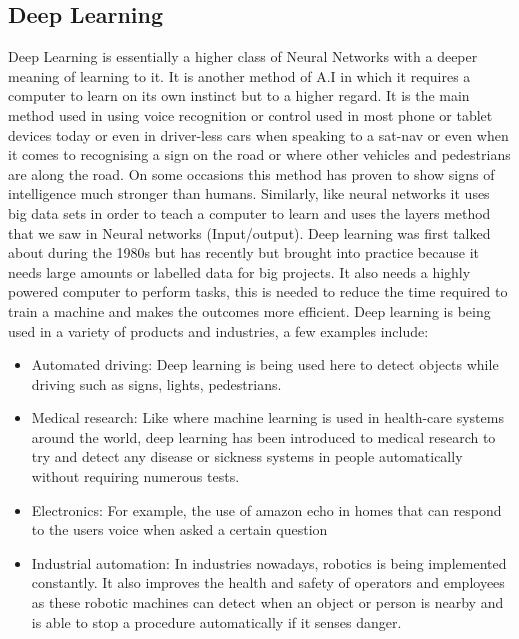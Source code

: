 \documentclass[letterpaper, 10 pt, conference]{ieeeconf}  %
\begin{document}
\subsection{Deep Learning}
Deep Learning is essentially a higher class of Neural Networks with a deeper meaning of learning to it. It is another method of A.I in which it requires a computer to learn on its own instinct but to a higher regard. It is the main method used in using voice recognition or control used in most phone or tablet devices today or even in driver-less cars when speaking to a sat-nav or even when it comes to recognising a sign on the road or where other vehicles and pedestrians are along the road. On some occasions this method has proven to show signs of intelligence much stronger than humans. Similarly, like neural networks it uses big data sets in order to teach a computer to learn and uses the layers method that we saw in Neural networks (Input/output). Deep learning was first talked about during the 1980s but has recently but brought into practice because it needs large amounts or labelled data for big projects. It also needs a highly powered computer to perform tasks, this is needed to reduce the time required to train a machine and makes the outcomes more efficient. Deep learning is being used in a variety of products and industries, a few examples include:
\begin{itemize}
\item Automated driving: Deep learning is being used here to detect objects while driving such as signs, lights, pedestrians.
\end{itemize}

\begin{itemize}
\item Medical research: Like where machine learning is used in health-care systems around the world, deep learning has been introduced to medical research to try and detect any disease or sickness systems in people automatically without requiring numerous tests.
\end{itemize}

\begin{itemize}
\item Electronics: For example, the use of amazon echo in homes that can respond to the users voice when asked a certain question
\end{itemize}

\begin{itemize}
\item Industrial automation: In industries nowadays, robotics is being implemented constantly. It also improves the health and safety of operators and employees as these robotic machines can detect when an object or person is nearby and is able to stop a procedure automatically if it senses danger.
\end{itemize}
\end{document}
